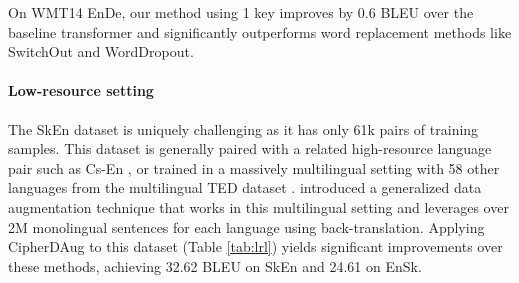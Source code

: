 \documentclass[11pt]{article}
\begin{document}
On WMT14 EnDe, our method using 1 key improves by 0.6 BLEU over the baseline transformer and significantly outperforms word replacement methods like SwitchOut and WordDropout. 



\paragraph{Low-resource setting} The SkEn dataset is uniquely challenging as it has only 61k pairs of training samples. This dataset is generally paired with a related high-resource language pair such as Cs-En \cite{neubig-hu-2018-rapid}, or trained in a massively multilingual setting \cite{aharoni-etal-2019-massively} with 58 other languages from the multilingual TED dataset \cite{qi-etal-2018-pre}. \citet{xia-etal-2019-generalized} introduced a generalized data augmentation technique that works in this multilingual setting and leverages over 2M monolingual sentences for each language using back-translation. Applying CipherDAug to this dataset (Table \ref{tab:lrl}) yields significant improvements over these methods, achieving 32.62 BLEU on SkEn and 24.61 on EnSk.
\end{document}
